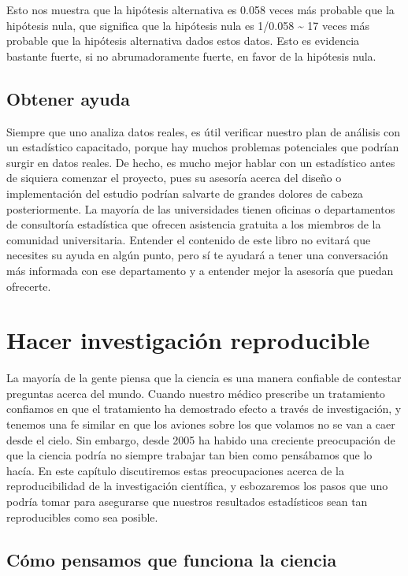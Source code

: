 \documentclass[
  12pt,
]{book}
\begin{document}
Esto nos muestra que la hipótesis alternativa es 0.058 veces más probable que la hipótesis nula, que significa que la hipótesis nula es 1/0.058 \textasciitilde{} 17 veces más probable que la hipótesis alternativa dados estos datos. Esto es evidencia bastante fuerte, si no abrumadoramente fuerte, en favor de la hipótesis nula.

\hypertarget{obtener-ayuda}{%
\section{Obtener ayuda}\label{obtener-ayuda}}

Siempre que uno analiza datos reales, es útil verificar nuestro plan de análisis con un estadístico capacitado, porque hay muchos problemas potenciales que podrían surgir en datos reales. De hecho, es mucho mejor hablar con un estadístico antes de siquiera comenzar el proyecto, pues su asesoría acerca del diseño o implementación del estudio podrían salvarte de grandes dolores de cabeza posteriormente. La mayoría de las universidades tienen oficinas o departamentos de consultoría estadística que ofrecen asistencia gratuita a los miembros de la comunidad universitaria. Entender el contenido de este libro no evitará que necesites su ayuda en algún punto, pero sí te ayudará a tener una conversación más informada con ese departamento y a entender mejor la asesoría que puedan ofrecerte.

\hypertarget{doing-reproducible-research}{%
\chapter{Hacer investigación reproducible}\label{doing-reproducible-research}}

La mayoría de la gente piensa que la ciencia es una manera confiable de contestar preguntas acerca del mundo. Cuando nuestro médico prescribe un tratamiento confiamos en que el tratamiento ha demostrado efecto a través de investigación, y tenemos una fe similar en que los aviones sobre los que volamos no se van a caer desde el cielo. Sin embargo, desde 2005 ha habido una creciente preocupación de que la ciencia podría no siempre trabajar tan bien como pensábamos que lo hacía. En este capítulo discutiremos estas preocupaciones acerca de la reproducibilidad de la investigación científica, y esbozaremos los pasos que uno podría tomar para asegurarse que nuestros resultados estadísticos sean tan reproducibles como sea posible.

\hypertarget{cuxf3mo-pensamos-que-funciona-la-ciencia}{%
\section{Cómo pensamos que funciona la ciencia}\label{cuxf3mo-pensamos-que-funciona-la-ciencia}}
\end{document}
